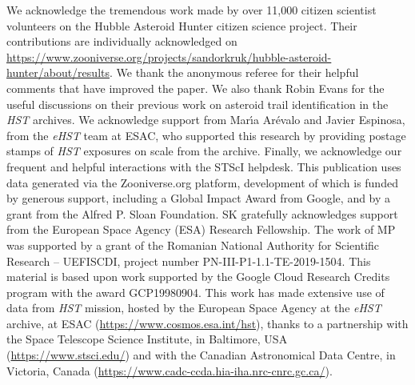 \documentclass{aa}
\begin{document}
\begin{acknowledgements}
We acknowledge the tremendous work made by over 11,000 citizen scientist volunteers on the Hubble Asteroid Hunter citizen science project. Their contributions are individually acknowledged on \url{https://www.zooniverse.org/projects/sandorkruk/hubble-asteroid-hunter/about/results}. We thank the anonymous referee for their helpful comments that have improved the paper. We also thank Robin Evans for the useful discussions on their previous work on asteroid trail identification in the \textit{HST} archives. We acknowledge support from Mar\'{\i}a Ar\'evalo and Javier Espinosa, from the {\it eHST} team at ESAC, who supported this research by providing postage stamps of \textit{HST} exposures on scale from the archive. Finally, we acknowledge our frequent and helpful interactions with the STScI helpdesk. This publication uses data generated via the Zooniverse.org platform, development of which is funded by generous support, including a Global Impact Award from Google, and by a grant from the Alfred P. Sloan Foundation. SK gratefully acknowledges support from the European Space Agency (ESA) Research Fellowship. The work of MP was supported by a grant of the Romanian National Authority for  Scientific  Research -- UEFISCDI, project number PN-III-P1-1.1-TE-2019-1504. This material is based upon work supported by the Google Cloud Research Credits program with the award GCP19980904. This work has made extensive use of data from {\it HST} mission, hosted by the European Space Agency at the {\it eHST} archive, at ESAC (\url{https://www.cosmos.esa.int/hst}), thanks to a partnership with the Space Telescope Science Institute, in Baltimore, USA (\url{https://www.stsci.edu/}) and  with the Canadian Astronomical Data Centre, in Victoria, Canada (\url{https://www.cadc-ccda.hia-iha.nrc-cnrc.gc.ca/}).\\

\end{acknowledgements}

\end{document}

